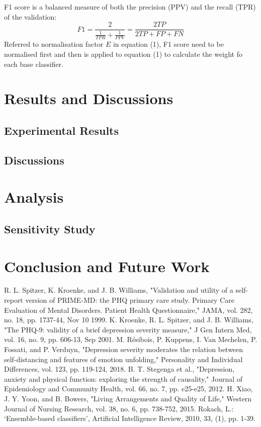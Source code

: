\documentclass[runningheads]{llncs}
\begin{document}
F1 score is a balanced measure of both the precision (PPV) and the recall (TPR) of the validation: 
\begin{equation}\label{reio}
	F1 = \frac{2 }{\frac{1}{TPR} + \frac{1}{PPV}} = \frac{2TP}{2TP + FP + FN}
\end{equation}
Referred to normalisation factor $E$ in equation (1), F1 score need to be normalised first and then is applied to equation (1) to calculate the weight fo each base classifier. 
%
%
%
%
%
%
%
%
%
%
%
%
%
%
%
%
%
%
%
%
%
%
\pagebreak
\section{Results and Discussions}
\subsection{Experimental Results}
\subsection{Discussions}
%
%
%
%
%
%
%
%
%
%
%
%
%
%
%
%
%
%
%
%
%
\pagebreak
\section{Analysis}
\subsection{Sensitivity Study}
%
%
%
%
%
%
%
%
%
%
%
%
%
%
%
%
%
%
%
%
%
\pagebreak
\section{Conclusion and Future Work}
%
%
%
\pagebreak
\begin{thebibliography}{8}
%
	R. L. Spitzer, K. Kroenke, and J. B. Williams, "Validation and utility of a self-report version of PRIME-MD: the PHQ primary care study. Primary Care Evaluation of Mental Disorders. Patient Health Questionnaire," JAMA, vol. 282, no. 18, pp. 1737-44, Nov 10 1999.
%
	K. Kroenke, R. L. Spitzer, and J. B. Williams, "The PHQ-9: validity of a brief depression severity measure," J Gen Intern Med, vol. 16, no. 9, pp. 606-13, Sep 2001.
%
	M. Résibois, P. Kuppens, I. Van Mechelen, P. Fossati, and P. Verduyn, "Depression severity moderates the relation between self-distancing and features of emotion unfolding," Personality and Individual Differences, vol. 123, pp. 119-124, 2018.
%
	B. T. Stegenga et al., "Depression, anxiety and physical function: exploring the strength of causality," Journal of Epidemiology and Community Health, vol. 66, no. 7, pp. e25-e25, 2012.
%
	H. Xiao, J. Y. Yoon, and B. Bowers, "Living Arrangements and Quality of Life," Western Journal of Nursing Research, vol. 38, no. 6, pp. 738-752, 2015.
%
%
 Rokach, L.: ‘Ensemble-based classifiers’, Artificial Intelligence Review, 2010, 33, (1), pp. 1-39.
%
%
%
%
%
%
%
%
%
%
%
%
%
%
%
%
\end{thebibliography}
\end{document}
